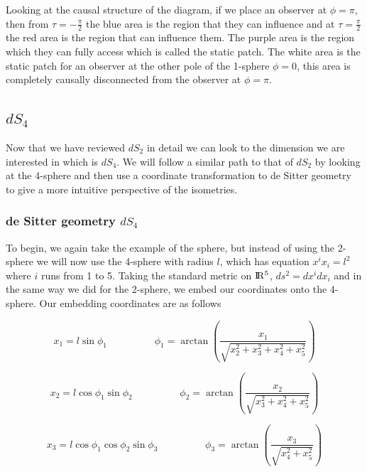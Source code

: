 \documentclass[a4paper,11pt]{article}
\numberwithin{equation}{section}
\numberwithin{figure}{section}
\begin{document}
\begin{large}
Looking at the causal structure of the diagram, if we place an observer at $\phi=\pi$, then from $\tau=-\frac{\pi}{2}$ the blue area is the region that they can influence and at $\tau=\frac{\pi}{2}$ the red area is the region that can influence them. The purple area is the region which they can fully access which is called the static patch. The white area is the static patch for an observer at the other pole of the 1-sphere $\phi=0$, this area is completely causally disconnected from the observer at $\phi=\pi$.

\vspace{0.5cm}

\subsection{$dS_4$}


Now that we have reviewed $dS_2$ in detail we can look to the dimension we are interested in which is $dS_4$. We will follow a similar path to that of $dS_2$ by looking at the 4-sphere and then use a coordinate transformation to de Sitter geometry to give a more intuitive perspective of the isometries.


\subsubsection{de Sitter geometry $dS_4$}

To begin, we again take the example of the sphere, but instead of using the 2-sphere we will now use the 4-sphere with radius $l$, which has equation $x^ix_i=l^2$ where $i$ runs from 1 to 5. Taking the standard metric on $\rm I\!R^5$, $ds^2=dx^i dx_i$ and in the same way we did for the 2-sphere, we embed our coordinates onto the 4-sphere. Our embedding coordinates are as follows

\begin{equation}
\label{eq:embed 4-sphere1}    
    x_1= l \sin \phi_1 \hspace{2cm} \phi_1=\arctan \left( \frac{x_1}{\sqrt{x_2^2+x_3^2+x_4^2+x_5^2}} \right)
\end{equation}

\begin{equation}
\label{eq:embed 4-sphere2}    
    x_2= l \cos \phi_1 \sin \phi_2 \hspace{2cm} \phi_2=\arctan \left( \frac{x_2}{\sqrt{x_3^2+x_4^2+x_5^2}} \right)
\end{equation}

\begin{equation}
\label{eq:embed 4-sphere3}    
    x_3= l \cos \phi_1 \cos \phi_2 \sin \phi_3 \hspace{2cm} \phi_3=\arctan \left( \frac{x_3}{\sqrt{x_4^2+x_5^2}} \right)
\end{equation}


\end{large}
\end{document}

